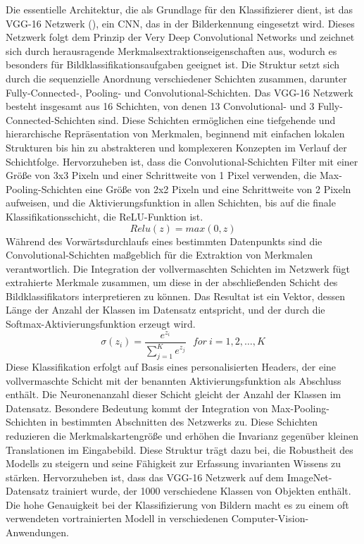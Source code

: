Die essentielle Architektur, die als Grundlage für den Klassifizierer dient, ist das VGG-16 Netzwerk (\cite{simonyan_very_2015}), ein CNN, das in der Bilderkennung eingesetzt wird. Dieses Netzwerk folgt dem Prinzip der \glqq Very Deep Convolutional Networks\grqq{} und zeichnet sich durch herausragende Merkmalsextraktionseigenschaften aus, wodurch es besonders für Bildklassifikationsaufgaben geeignet ist. Die Struktur setzt sich durch die sequenzielle Anordnung verschiedener Schichten zusammen, darunter Fully-Connected-, Pooling- und Convolutional-Schichten.
Das VGG-16 Netzwerk besteht insgesamt aus 16 Schichten, von denen 13 Convolutional- und 3 Fully-Connected-Schichten sind. Diese Schichten ermöglichen eine tiefgehende und hierarchische Repräsentation von Merkmalen, beginnend mit einfachen lokalen Strukturen bis hin zu abstrakteren und komplexeren Konzepten im Verlauf der Schichtfolge. Hervorzuheben ist, dass die Convolutional-Schichten Filter mit einer Größe von 3x3 Pixeln und einer Schrittweite von 1 Pixel verwenden, die Max-Pooling-Schichten eine Größe von 2x2 Pixeln und eine Schrittweite von 2 Pixeln aufweisen, und die Aktivierungsfunktion in allen Schichten, bis auf die finale Klassifikationsschicht, die ReLU-Funktion ist. 
\begin{equation}
	Relu(z) = max(0, z)
\end{equation}
Während des Vorwärtsdurchlaufs eines bestimmten Datenpunkts sind die Convolutional-Schichten maßgeblich für die Extraktion von Merkmalen verantwortlich.
Die Integration der vollvermaschten Schichten im Netzwerk fügt extrahierte Merkmale zusammen, um diese in der abschließenden Schicht des Bildklassifikators interpretieren zu können. Das Resultat ist ein Vektor, dessen Länge der Anzahl der Klassen im Datensatz entspricht, und der durch die Softmax-Aktivierungsfunktion erzeugt wird. 
\begin{equation}
	\sigma(z_i) = \frac{e^{z_{i}}}{\sum_{j=1}^K e^{z_{j}}} \ \ \ for\ i=1,2,\dots,K
\end{equation}
Diese Klassifikation erfolgt auf Basis eines personalisierten Headers, der eine vollvermaschte Schicht mit der benannten Aktivierungsfunktion als Abschluss enthält. Die Neuronenanzahl dieser Schicht gleicht der Anzahl der Klassen im Datensatz.
Besondere Bedeutung kommt der Integration von Max-Pooling-Schichten in bestimmten Abschnitten des Netzwerks zu. Diese Schichten reduzieren die Merkmalskartengröße und erhöhen die Invarianz gegenüber kleinen Translationen im Eingabebild. Diese Struktur trägt dazu bei, die Robustheit des Modells zu steigern und seine Fähigkeit zur Erfassung invarianten Wissens zu stärken.
Hervorzuheben ist, dass das VGG-16 Netzwerk auf dem ImageNet-Datensatz trainiert wurde, der 1000 verschiedene Klassen von Objekten enthält. Die hohe Genauigkeit bei der Klassifizierung von Bildern macht es zu einem oft verwendeten vortrainierten Modell in verschiedenen Computer-Vision-Anwendungen. 

